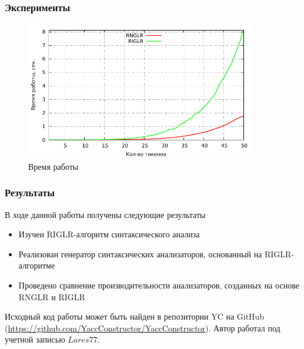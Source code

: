 \documentclass{beamer}
\begin{document}
\begin{frame}[fragile]
	\transwipe[direction=90]
	\frametitle{Эксперименты}
	\begin{figure}
		\includegraphics[width=0.9\textwidth]{pictures/time.pdf}
		\caption{Время работы}
	\end{figure}
\end{frame}

\begin{frame}
  \transwipe[direction=90]
  \frametitle{Результаты}
  В ходе данной работы получены следующие результаты
  \begin{itemize}
    \item Изучен RIGLR-алгоритм синтаксического анализа
    \item Реализован генератор синтаксических анализаторов, основанный на RIGLR-алгоритме
    \item Проведено сравнение производительности анализаторов, созданных на основе RNGLR и RIGLR  
  \end{itemize}
  Исходный код работы может быть найден в репозитории YC на GitHub (\hyperlink{a}{https://github.com/YaccConstructor/YaccConstructor}). Автор работал под учетной записью $Lares77$.
\end{frame}
\end{document}
